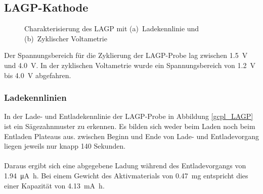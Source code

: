 \documentclass[a4paper, 11pt, headsepline,footsepline,twoside,abstract]{scrbook}
\begin{document}
\subsection{LAGP-Kathode}
\begin{figure}[b!]
   \centering
       \vspace{3mm}
	\caption{Charakterisierung des LAGP mit (a)~Ladekennlinie und (b)~Zyklischer Voltametrie}
   	\label{ec_LAGP}
\end{figure}
Der Spannungsbereich für die Zyklierung der LAGP-Probe lag zwischen \SI{1.5}{\volt} und \SI{4.0}{\volt}. In der zyklischen Voltametrie wurde ein Spannungsbereich von \SI{1.2}{\volt} bis \SI{4.0}{\volt} abgefahren.
\subsubsection{Ladekennlinien}
In der Lade- und Entladekennlinie der LAGP-Probe in Abbildung \ref{gcpl_LAGP} ist ein Sägezahnmuster zu erkennen. Es bilden sich weder beim Laden noch beim Entladen Plateaus aus. zwischen Beginn und Ende von Lade- und Entladevorgang liegen jeweils nur knapp 140 Sekunden.
\\\\
Daraus ergibt sich eine abgegebene Ladung während des Entladevorgangs von \SI{1.94}{\micro\ampere\hour}. Bei einem Gewicht des Aktivmaterials von \SI{0.47}{\milli\gram} entspricht dies einer Kapazität von \SI{4.13}{\milli\ampere\hour}.
\end{document}
